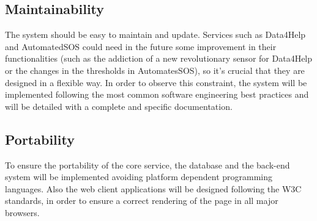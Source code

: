\subsection{Maintainability}
The system should be easy to maintain and update. Services such as Data4Help and AutomatedSOS could need in the future some improvement in their functionalities (such as the addiction of a new revolutionary sensor for Data4Help or the changes in the thresholds in AutomatesSOS), so it's crucial that they are designed in a flexible way.
In order to observe this constraint, the system will be implemented following the most common software engineering best practices and will be detailed with a complete and specific documentation.

\subsection{Portability}
To ensure the portability of the core service, the database and the back-end system will be implemented avoiding platform dependent programming languages.
Also the web client applications will be designed following the W3C standards, in order to ensure a correct rendering of the page in all major browsers.